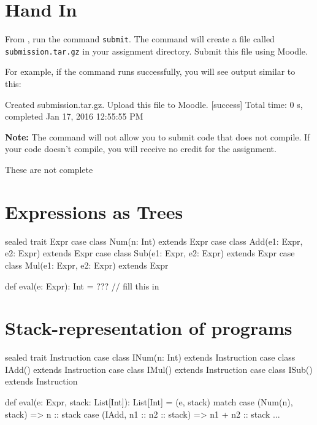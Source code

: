 \documentclass{book}
\begin{document}
\section{Hand In}

From \sbt{}, run the command \verb|submit|. The command will create
a file called \verb|submission.tar.gz| in your assignment directory.
Submit this file using Moodle.

For example, if the command runs successfully, you will see output similar
to this:
%
\begin{console}
Created submission.tar.gz. Upload this file to Moodle.
[success] Total time: 0 s, completed Jan 17, 2016 12:55:55 PM
\end{console}

\textbf{Note:}  The command will not allow you to submit code that does not
compile. If your code doesn't compile, you will receive no credit for the
assignment.

\newlecture

\begin{instructor}
These are not complete
\end{instructor}

\section{Expressions as Trees}

\begin{scalacode}
sealed trait Expr
case class Num(n: Int) extends Expr
case class Add(e1: Expr, e2: Expr) extends Expr
case class Sub(e1: Expr, e2: Expr) extends Expr
case class Mul(e1: Expr, e2: Expr) extends Expr

def eval(e: Expr): Int = ??? // fill this in
\end{scalacode}

\section{Stack-representation of programs}

\begin{scalacode}
sealed trait Instruction
case class INum(n: Int) extends Instruction
case class IAdd() extends Instruction
case class IMul() extends Instruction
case class ISub() extends Instruction

def eval(e: Expr, stack: List[Int]): List[Int] = (e, stack) match {
  case (Num(n), stack) => n :: stack
  case (IAdd, n1 :: n2 :: stack) => n1 + n2 :: stack
  ...
}
\end{scalacode}
\end{document}
